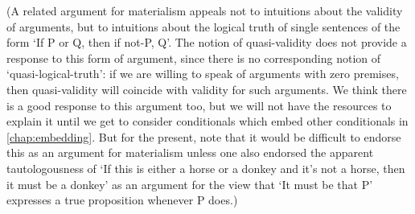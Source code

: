 \documentclass[If.tex]{subfiles}
\begin{document}
(A related argument for materialism appeals not to intuitions about the validity of arguments, but to intuitions about the logical truth of single sentences of the form ‘If P or Q, then if not-P, Q’. The notion of quasi-validity does not provide a response to this form of argument, since there is no corresponding notion of ‘quasi-logical-truth’: if we are willing to speak of arguments with zero premises, then quasi-validity will coincide with validity for such arguments. We think there is a good response to this argument too, but we will not have the resources to explain it until we get to consider conditionals which embed other conditionals in \autoref{chap:embedding}. But for the present, note that it would be difficult to endorse this as an argument for materialism unless one also endorsed the apparent tautologousness of ‘If this is either a horse or a donkey and it's not a horse, then it must be a donkey’ as an argument for the view that ‘It must be that P’ expresses a true proposition whenever P does.)
\end{document}

